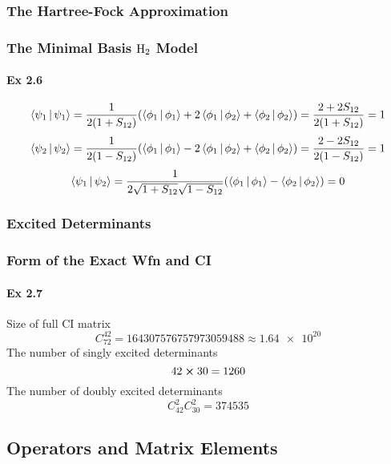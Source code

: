 \documentclass[a4paper]{article}
\newcommand{\ex}[1]{\paragraph{Ex #1}}
\numberwithin{equation}{subsection}
\begin{document}
\subsubsection{The Hartree-Fock Approximation}
\subsubsection{The Minimal Basis $ \ce{H_2} $ Model}
\ex{2.6}
\begin{equation}\label{key}
\Braket{\psi_1 | \psi_1} = \dfrac{1}{2(1+S_{12})}\qty(\Braket{\phi_1|\phi_1} + 2\Braket{\phi_1|\phi_2} + \Braket{\phi_2|\phi_2}) = \dfrac{2 + 2S_{12}}{2(1+S_{12})} = 1
\end{equation}
\begin{equation}\label{key}
\Braket{\psi_2 | \psi_2} = \dfrac{1}{2(1-S_{12})}\qty(\Braket{\phi_1|\phi_1} - 2\Braket{\phi_1|\phi_2} + \Braket{\phi_2|\phi_2}) = \dfrac{2 - 2S_{12}}{2(1-S_{12})} = 1
\end{equation}
\begin{equation}\label{key}
\Braket{\psi_1 | \psi_2} = \dfrac{1}{2\sqrt{1+S_{12}}\sqrt{1-S_{12}}}\qty(\Braket{\phi_1|\phi_1} - \Braket{\phi_2|\phi_2}) = 0
\end{equation}
\subsubsection{Excited Determinants}
\subsubsection{Form of the Exact Wfn and CI}
\ex{2.7}
Size of full CI matrix
\begin{equation}\label{key}
C_{72}^{42} = 164307576757973059488 \approx \num{1.64e20}
\end{equation}
The number of singly excited determinants
\begin{equation}\label{key}
42\cross 30 = 1260
\end{equation}
The number of doubly excited determinants
\begin{equation}\label{key}
C_{42}^2 C_{30}^2 = 374535
\end{equation}

\subsection{Operators and Matrix Elements}
\end{document}
